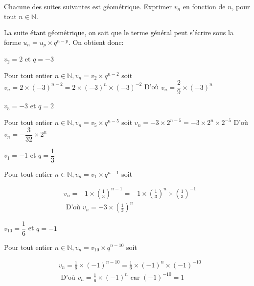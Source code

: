 \documentclass[11pt,a4paper]{article}  %
\begin{document}
Chacune des suites suivantes est géométrique. Exprimer $v_n$ en fonction de $n$, pour tout $n \in \mathbb{N}$.
\begin{corrBox}
	La suite étant géométrique, on sait que le terme général peut s'écrire sous la forme $u_n=u_p \times q^{n-p}$. On obtient donc:	
\end{corrBox}
	\begin{enumMet}
	\item $v_2=2$ et $q=-3$
	\begin{corrBox}
		Pour tout entier $n \in \mathbb{N}, v_n=v_2 \times q^{n-2}$ soit $v_n=2 \times(-3)^{n-2}=2 \times(-3)^n \times(-3)^{-2}$ D'où $v_n=\dfrac{2}{9} \times(-3)^n$		
	\end{corrBox}
	\item $v_5=-3$ et $q=2$
	\begin{corrBox}
		Pour tout entier $n \in \mathbb{N}, v_n=v_5 \times q^{n-5}$ soit $v_n=-3 \times 2^{n-5}=-3 \times 2^n \times 2^{-5}$ D'où $v_n=-\dfrac{3}{32} \times 2^n$		
	\end{corrBox}
	\item $v_1=-1$ et $q=\dfrac{1}{3}$
	\begin{corrBox}
		Pour tout entier $n \in \mathbb{N}, v_n=v_1 \times q^{n-1}$ soit
		
		$$
		\begin{aligned}
			& v_n=-1 \times\left(\frac{1}{3}\right)^{n-1}=-1 \times\left(\frac{1}{3}\right)^n \times\left(\frac{1}{3}\right)^{-1} \\
			& \text { D'où } v_n=-3 \times\left(\frac{1}{3}\right)^n
		\end{aligned}
		$$		
	\end{corrBox}
	\item $v_{10}=\dfrac{1}{6}$ et $q=-1$
	\begin{corrBox}
		Pour tout entier $n \in \mathbb{N}, v_n=v_{10} \times q^{n-10}$ soit
		
		$$
		\begin{aligned}
			& v_n=\frac{1}{6} \times(-1)^{n-10}=\frac{1}{6} \times(-1)^n \times(-1)^{-10} \\
			& \text { D'où } v_n=\frac{1}{6} \times(-1)^n \text { car }(-1)^{-10}=1
		\end{aligned}
		$$
				
	\end{corrBox}
\end{enumMet}
\end{document}
